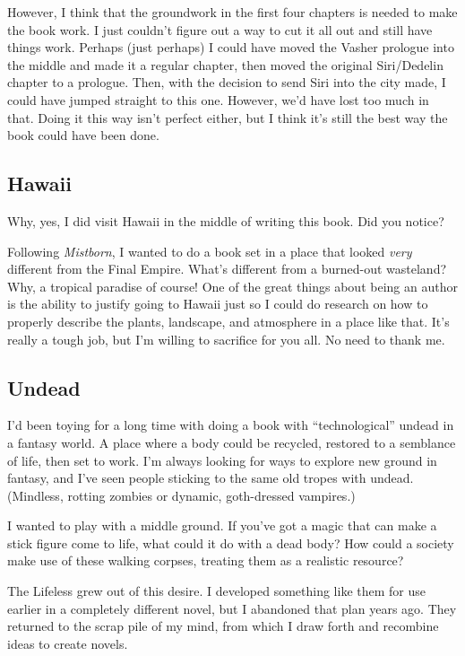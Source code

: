 However, I think that the groundwork in the first four chapters is needed to make the book work. I just couldn’t figure out a way to cut it all out and still have things work. Perhaps (just perhaps) I could have moved the Vasher prologue into the middle and made it a regular chapter, then moved the original Siri/Dedelin chapter to a prologue. Then, with the decision to send Siri into the city made, I could have jumped straight to this one. However, we’d have lost too much in that. Doing it this way isn’t perfect either, but I think it’s still the best way the book could have been done.

\subsection*{Hawaii}

Why, yes, I did visit Hawaii in the middle of writing this book. Did you notice?

Following \textit{Mistborn}, I wanted to do a book set in a place that looked \textit{very} different from the Final Empire. What’s different from a burned-out wasteland? Why, a tropical paradise of course! One of the great things about being an author is the ability to justify going to Hawaii just so I could do research on how to properly describe the plants, landscape, and atmosphere in a place like that. It’s really a tough job, but I’m willing to sacrifice for you all. No need to thank me.

\subsection*{Undead}

I’d been toying for a long time with doing a book with “technological” undead in a fantasy world. A place where a body could be recycled, restored to a semblance of life, then set to work. I’m always looking for ways to explore new ground in fantasy, and I’ve seen people sticking to the same old tropes with undead. (Mindless, rotting zombies or dynamic, goth-dressed vampires.)

I wanted to play with a middle ground. If you’ve got a magic that can make a stick figure come to life, what could it do with a dead body? How could a society make use of these walking corpses, treating them as a realistic resource?

The Lifeless grew out of this desire. I developed something like them for use earlier in a completely different novel, but I abandoned that plan years ago. They returned to the scrap pile of my mind, from which I draw forth and recombine ideas to create novels.

